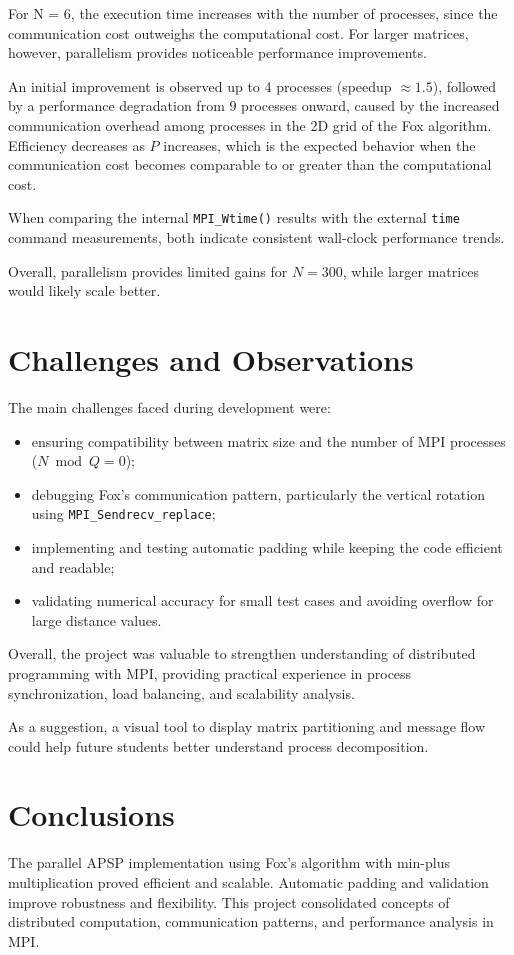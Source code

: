 \documentclass[10pt,a4paper]{article}
\begin{document}
For N = 6, the execution time increases with the number of processes, since the communication cost outweighs the computational cost. 
For larger matrices, however, parallelism provides noticeable performance improvements.

An initial improvement is observed up to 4 processes (speedup $\approx 1.5$), followed by a performance degradation from 9 processes onward, caused by the increased communication overhead among processes in the 2D grid of the Fox algorithm. 
Efficiency decreases as $P$ increases, which is the expected behavior when the communication cost becomes comparable to or greater than the computational cost.

When comparing the internal \texttt{MPI\_Wtime()} results with the external \texttt{time} command measurements, both indicate consistent wall-clock performance trends.

Overall, parallelism provides limited gains for $N = 300$, while larger matrices would likely scale better.

\section{Challenges and Observations}
The main challenges faced during development were:
\begin{itemize}
  \item ensuring compatibility between matrix size and the number of MPI processes (\(N \bmod Q = 0\));
  \item debugging Fox's communication pattern, particularly the vertical rotation using \texttt{MPI\_Sendrecv\_replace};
  \item implementing and testing automatic padding while keeping the code efficient and readable;
  \item validating numerical accuracy for small test cases and avoiding overflow for large distance values.
\end{itemize}

Overall, the project was valuable to strengthen understanding of distributed programming with MPI, providing practical experience in process synchronization, load balancing, and scalability analysis.
 
As a suggestion, a visual tool to display matrix partitioning and message flow could help future students better understand process decomposition.

\section{Conclusions}
The parallel APSP implementation using Fox’s algorithm with min-plus multiplication proved efficient and scalable.  
Automatic padding and validation improve robustness and flexibility.  
This project consolidated concepts of distributed computation, communication patterns, and performance analysis in MPI.
\end{document}
